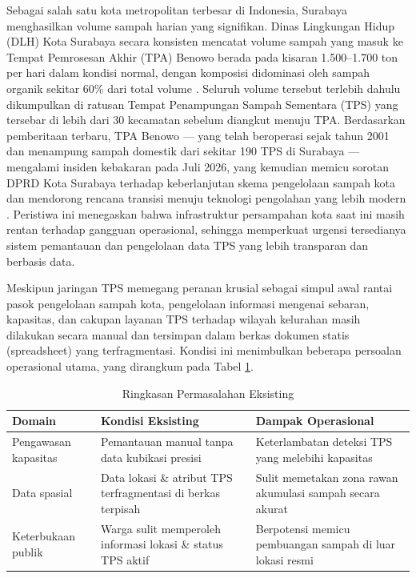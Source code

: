 \documentclass[conference]{IEEEtran}
\begin{document}
Sebagai salah satu kota metropolitan terbesar di Indonesia, Surabaya
menghasilkan volume sampah harian yang signifikan. Dinas Lingkungan
Hidup (DLH) Kota Surabaya secara konsisten mencatat volume sampah yang
masuk ke Tempat Pemrosesan Akhir (TPA) Benowo berada pada kisaran
1.500--1.700 ton per hari dalam kondisi normal, dengan komposisi
didominasi oleh sampah organik sekitar 60\% dari total volume
\cite{antara2023,liputan62023}. Seluruh volume tersebut terlebih
dahulu dikumpulkan di ratusan Tempat Penampungan Sampah Sementara
(TPS) yang tersebar di lebih dari 30 kecamatan sebelum diangkut menuju
TPA. Berdasarkan pemberitaan terbaru, TPA Benowo --- yang telah
beroperasi sejak tahun 2001 dan menampung sampah domestik dari sekitar
190 TPS di Surabaya \cite{kompas2026} --- mengalami insiden kebakaran
pada Juli 2026, yang kemudian memicu sorotan DPRD Kota Surabaya
terhadap keberlanjutan skema pengelolaan sampah kota dan mendorong
rencana transisi menuju teknologi pengolahan yang lebih modern
\cite{suararakyat2026}. Peristiwa ini menegaskan bahwa infrastruktur
persampahan kota saat ini masih rentan terhadap gangguan operasional,
sehingga memperkuat urgensi tersedianya sistem pemantauan dan
pengelolaan data TPS yang lebih transparan dan berbasis data.

Meskipun jaringan TPS memegang peranan krusial sebagai simpul awal
rantai pasok pengelolaan sampah kota, pengelolaan informasi mengenai
sebaran, kapasitas, dan cakupan layanan TPS terhadap wilayah kelurahan
masih dilakukan secara manual dan tersimpan dalam berkas dokumen
statis (spreadsheet) yang terfragmentasi. Kondisi ini menimbulkan
beberapa persoalan operasional utama, yang dirangkum pada Tabel
\ref{tab:masalah}.

\begin{table}[h]
    \caption{Ringkasan Permasalahan Eksisting}
    \label{tab:masalah}
    \centering
    \begin{tabular}{p{1.7cm}p{2.4cm}p{3.4cm}}
        \hline
        \textbf{Domain}      & \textbf{Kondisi Eksisting}                                   & \textbf{Dampak Operasional}                               \\
        \hline
        Pengawasan kapasitas & Pemantauan manual tanpa data kubikasi presisi                & Keterlambatan deteksi TPS yang melebihi kapasitas         \\
        \hline
        Data spasial         & Data lokasi \& atribut TPS terfragmentasi di berkas terpisah & Sulit memetakan zona rawan akumulasi sampah secara akurat \\
        \hline
        Keterbukaan publik   & Warga sulit memperoleh informasi lokasi \& status TPS aktif  & Berpotensi memicu pembuangan sampah di luar lokasi resmi  \\
        \hline
    \end{tabular}
\end{table}
\end{document}
